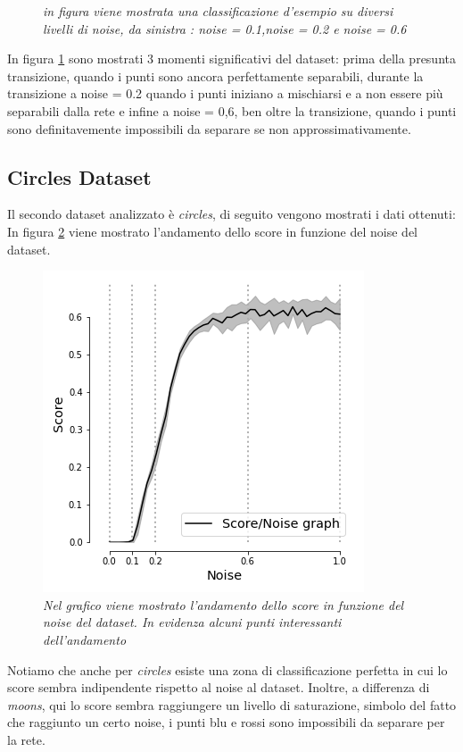 \documentclass[12pt,a4paper]{report}
\begin{document}
\begin{figure}[H]
 \caption{\textit{in figura viene mostrata una classificazione d'esempio su diversi livelli di noise, da sinistra : noise = 0.1,noise = 0.2 e noise = 0.6}}
 \label{exnoisemoons}
\end{figure}

In figura \ref{exnoisemoons} sono mostrati 3 momenti significativi del dataset: prima della presunta transizione, quando i punti sono ancora perfettamente separabili, durante la transizione a noise = 0.2 quando i punti iniziano a mischiarsi e a  non essere più separabili dalla rete e infine a noise = 0,6, ben oltre la transizione, quando i punti sono definitavemente impossibili da separare se non approssimativamente.

\newpage

\subsection{Circles Dataset}

Il secondo dataset analizzato è \textit{circles}, di seguito vengono mostrati i dati ottenuti:
In figura \ref{score_circles} viene mostrato l'andamento dello score in funzione del noise del dataset.

\begin{figure}[H]
 \centering
 \includegraphics[scale = 0.7]{images/score_noise_circles.png}
 \caption{\textit{Nel grafico viene mostrato l'andamento dello score in funzione del noise del dataset. In evidenza alcuni punti interessanti dell'andamento}}
 \label{score_circles}
\end{figure}

Notiamo che anche per \textit{circles} esiste una zona di classificazione perfetta in cui lo score sembra indipendente rispetto al noise al dataset.
Inoltre, a differenza di \textit{moons}, qui lo score sembra raggiungere un livello di saturazione, simbolo del fatto che raggiunto un certo noise, i punti blu e rossi sono impossibili da separare per la rete. 
\end{document}
